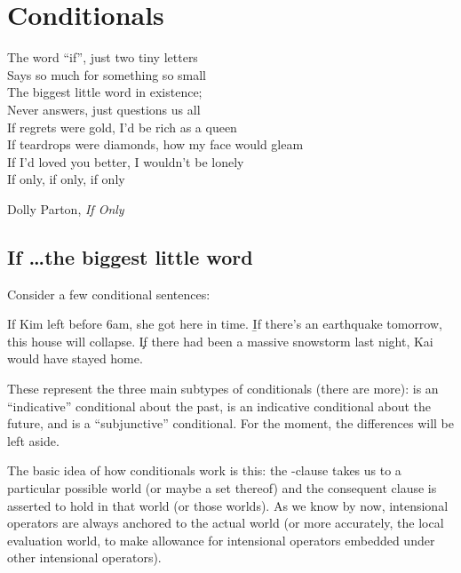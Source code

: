 \chapter{Conditionals}\label{cha:conditionals} %

\epigraph{The word ``if'', just two tiny letters \\
    Says so much for something so small \\
    The biggest little word in existence; \\
    Never answers, just questions us all\\[6pt]

    If regrets were gold, I'd be rich as a queen \\
    If teardrops were diamonds, how my face would gleam \\
    If I'd loved you better, I wouldn't be lonely \\
    If only, if only, if only}{Dolly Parton, \emph{If Only}}


\minitoc

\section{If \dots the biggest little word}
\label{sec:if}

Consider a few conditional sentences:

\ex
\a If Kim left before 6am, she got here in time.
\b If there's an earthquake tomorrow, this house will collapse.
\c If there had been a massive snowstorm last night, Kai would have stayed home.

These represent the three main subtypes of conditionals (there are more):
\Last[a] is an ``indicative'' conditional about the past, \Last[b] is an
indicative conditional about the future, and \Last[c] is a ``subjunctive''
conditional. For the moment, the differences will be left aside.

The basic idea of how conditionals work is this: the -clause
takes us to a particular possible world (or maybe a set thereof) and the
consequent clause is asserted to hold in that world (or those worlds). As we
know by now, intensional operators are always anchored to the actual world (or
more accurately, the local evaluation world, to make allowance for intensional
operators embedded under other intensional operators).

